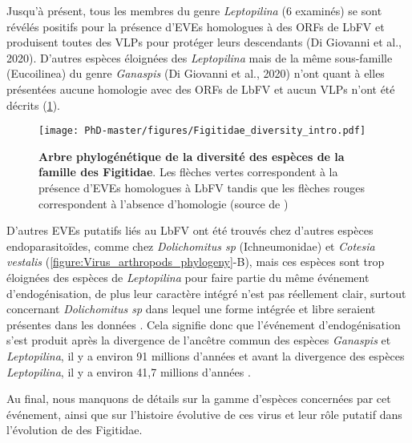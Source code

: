 Jusqu'à présent, tous les membres du genre \textit{Leptopilina} (6 examinés) se sont révélés positifs pour la présence d'EVEs homologues à des ORFs de LbFV et produisent toutes des VLPs pour protéger leurs descendants (Di Giovanni et al., 2020). D'autres espèces éloignées des \textit{Leptopilina} mais de la même sous-famille (Eucoilinea) du genre \textit{Ganaspis} (Di Giovanni et al., 2020) n'ont quant à elles présentées aucune homologie avec des ORFs de LbFV et aucun VLPs n'ont été décrits (\figurename{\ref{figure:Figitidae_diversity_intro}}).

\begin{figure}[H]
\captionsetup{font=footnotesize}
 \centering
  \texttt{[image: PhD-master/figures/Figitidae\_diversity\_intro.pdf]}
\caption[Intro:Arbre phylogénétique de la diversité des espèces de la famille des Figitidae]{\textbf{Arbre phylogénétique de la diversité des espèces de la famille des Figitidae}. Les flèches vertes correspondent à la présence d'EVEs homologues à LbFV tandis que les flèches rouges correspondent à l'absence d'homologie (source de \cite{blaimer_comprehensive_2020})}
\label{figure:Figitidae_diversity_intro}
\end{figure}

D'autres EVEs putatifs liés au LbFV ont été trouvés chez d'autres espèces endoparasitoïdes, comme chez \textit{Dolichomitus sp} (Ichneumonidae) \citep{burke_presence_2021} et \textit{Cotesia vestalis} \citep{burke_presence_2021} (\figurename{\ref{figure:Virus_arthropods_phylogeny}}-B), mais ces espèces sont trop éloignées des espèces de \textit{Leptopilina} pour faire partie du même événement d'endogénisation, de plus leur caractère intégré n'est pas réellement clair, surtout concernant \textit{Dolichomitus sp} dans lequel une forme intégrée et libre seraient présentes dans les données \citep{burke_endogenization_2020}. Cela signifie donc que l'événement d'endogénisation s'est produit après la divergence de l'ancêtre commun des espèces \textit{Ganaspis} et \textit{Leptopilina}, il y a environ 91 millions d'années \citep{blaimer_comprehensive_2020} et avant la divergence des espèces \textit{Leptopilina}, il y a environ 41,7 millions d'années \citep{blaimer_comprehensive_2020}. 

Au final, nous manquons de détails sur la gamme d'espèces concernées par cet événement, ainsi que sur l'histoire évolutive de ces virus et leur rôle putatif dans l'évolution de des Figitidae.